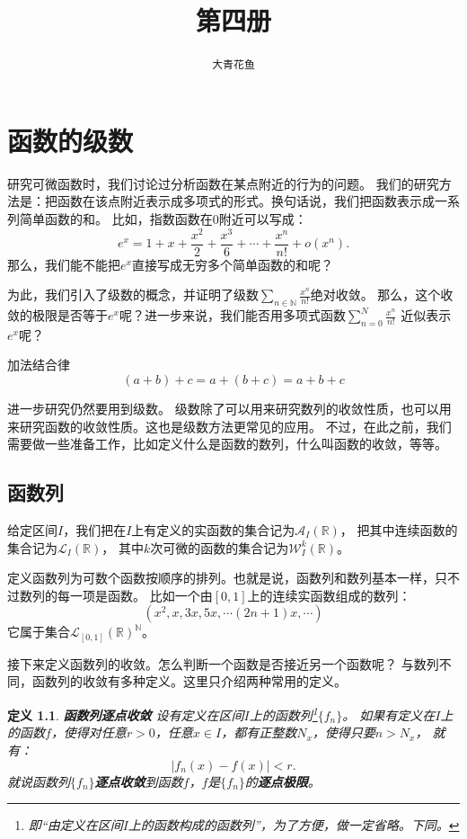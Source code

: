 \documentclass[12pt,UTF8]{ctexbook}
\title{\zihao{0} \bfseries 第四册}
\author{\zihao{2} \texttt{大青花鱼}}
\date{}
\newcommand{\olim}[1]{\mathit{o}\left(#1\right)}  %
\newtheorem{df}{定义}[section]
\begin{document}
\maketitle
\tableofcontents
\newpage

\chapter{函数的级数}

研究可微函数时，我们讨论过分析函数在某点附近的行为的问题。
我们的研究方法是：把函数在该点附近表示成多项式的形式。换句话说，我们把函数表示成一系列简单函数的和。
比如，指数函数在$0$附近可以写成：
$$e^x = 1 + x + \frac{x^2}{2} + \frac{x^3}{6} + \cdots + \frac{x^n}{n!} + \olim{x^n}.$$
那么，我们能不能把$e^x$直接写成无穷多个简单函数的和呢？

为此，我们引入了级数的概念，并证明了级数$\sum_{n\in\mathbb{N}}\frac{x^{n}}{n!}$绝对收敛。
那么，这个收敛的极限是否等于$e^x$呢？进一步来说，我们能否用多项式函数$\sum_{n=0}^N\frac{x^{n}}{n!}$
近似表示$e^x$呢？

\begin{blk}{加法结合律}
    \[(a+b)+c=a+(b+c)=a+b+c \]
\end{blk}

进一步研究仍然要用到级数。
级数除了可以用来研究数列的收敛性质，也可以用来研究函数的收敛性质。这也是级数方法更常见的应用。
不过，在此之前，我们需要做一些准备工作，比如定义什么是函数的数列，什么叫函数的收敛，等等。

\section{函数列}

给定区间$I$，我们把在$I$上有定义的实函数的集合记为$\mathcal{A}_I(\mathbb{R})$，
把其中连续函数的集合记为$\mathcal{L}_I(\mathbb{R})$，
其中$k$次可微的函数的集合记为$\mathcal{W}_I^k(\mathbb{R})$。

定义函数列为可数个函数按顺序的排列。也就是说，函数列和数列基本一样，只不过数列的每一项是函数。
比如一个由$[0,1]$上的连续实函数组成的数列：
$$ (x^2, x, 3x, 5x, \cdots (2n+1)x, \cdots )$$
它属于集合$\mathcal{L}_{[0,1]}(\mathbb{R})^{\mathbb{N}}$。

接下来定义函数列的收敛。怎么判断一个函数是否接近另一个函数呢？
与数列不同，函数列的收敛有多种定义。这里只介绍两种常用的定义。
\begin{df}{\textbf{函数列逐点收敛}}
    设有定义在区间$I$上的函数列\footnote{即“由定义在区间$I$上的函数构成的函数列”，为了方便，做一定省略。下同。}$\{f_n\}$。
    如果有定义在$I$上的函数$f$，使得对任意$r>0$，任意$x\in I$，都有正整数$N_x$，使得只要$n>N_x$，
    就有：
    $$ |f_n(x) - f(x) | < r.$$
    就说函数列$\{f_n\}$\textbf{逐点收敛}到函数$f$，$f$是$\{f_n\}$的\textbf{逐点极限}。
\end{df}
\end{document}
